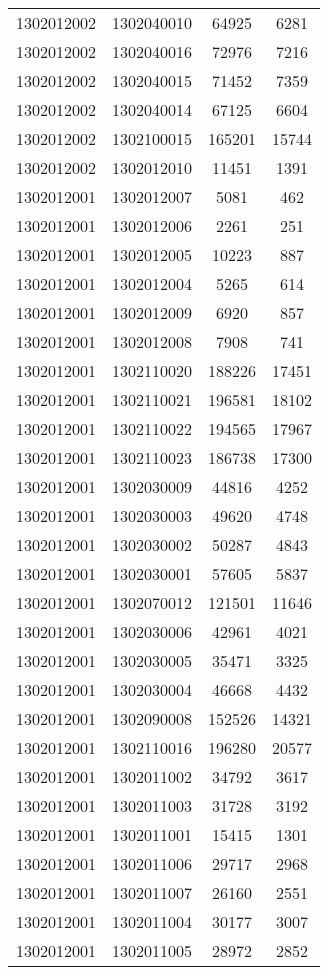 \begin{longtable}{llcc}
1302012002 & 1302040010 & 64925 & 6281\\
1302012002 & 1302040016 & 72976 & 7216\\
1302012002 & 1302040015 & 71452 & 7359\\
1302012002 & 1302040014 & 67125 & 6604\\
1302012002 & 1302100015 & 165201 & 15744\\
1302012002 & 1302012010 & 11451 & 1391\\
1302012001 & 1302012007 & 5081 & 462\\
1302012001 & 1302012006 & 2261 & 251\\
1302012001 & 1302012005 & 10223 & 887\\
1302012001 & 1302012004 & 5265 & 614\\
1302012001 & 1302012009 & 6920 & 857\\
1302012001 & 1302012008 & 7908 & 741\\
1302012001 & 1302110020 & 188226 & 17451\\
1302012001 & 1302110021 & 196581 & 18102\\
1302012001 & 1302110022 & 194565 & 17967\\
1302012001 & 1302110023 & 186738 & 17300\\
1302012001 & 1302030009 & 44816 & 4252\\
1302012001 & 1302030003 & 49620 & 4748\\
1302012001 & 1302030002 & 50287 & 4843\\
1302012001 & 1302030001 & 57605 & 5837\\
1302012001 & 1302070012 & 121501 & 11646\\
1302012001 & 1302030006 & 42961 & 4021\\
1302012001 & 1302030005 & 35471 & 3325\\
1302012001 & 1302030004 & 46668 & 4432\\
1302012001 & 1302090008 & 152526 & 14321\\
1302012001 & 1302110016 & 196280 & 20577\\
1302012001 & 1302011002 & 34792 & 3617\\
1302012001 & 1302011003 & 31728 & 3192\\
1302012001 & 1302011001 & 15415 & 1301\\
1302012001 & 1302011006 & 29717 & 2968\\
1302012001 & 1302011007 & 26160 & 2551\\
1302012001 & 1302011004 & 30177 & 3007\\
1302012001 & 1302011005 & 28972 & 2852\\

\end{longtable}
